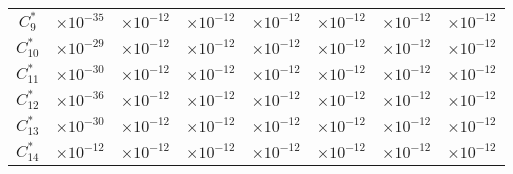 \begin{center}
\begin{tabular}[h]{|c|r|r|r|r|r|r|r|}
    $C_9^*$ &  $\times 10^{-35}$& $\times 10^{-12}$ & $\times 10^{-12}$ & $\times 10^{-12}$ & $\times 10^{-12}$ & $\times 10^{-12}$ & $\times 10^{-12}$ \\
    $C_{10}^*$ & $\times 10^{-29}$& $\times 10^{-12}$ & $\times 10^{-12}$ & $\times 10^{-12}$ & $\times 10^{-12}$ & $\times 10^{-12}$ & $\times 10^{-12}$ \\
    $C_{11}^*$ & $\times 10^{-30}$& $\times 10^{-12}$ & $\times 10^{-12}$ & $\times 10^{-12}$ & $\times 10^{-12}$ & $\times 10^{-12}$ & $\times 10^{-12}$  \\
    $C_{12}^*$ & $\times 10^{-36}$& $\times 10^{-12}$ & $\times 10^{-12}$ & $\times 10^{-12}$ & $\times 10^{-12}$ & $\times 10^{-12}$ & $\times 10^{-12}$  \\
    $C_{13}^*$ & $\times 10^{-30}$& $\times 10^{-12}$ & $\times 10^{-12}$ & $\times 10^{-12}$ & $\times 10^{-12}$ & $\times 10^{-12}$ & $\times 10^{-12}$  \\
    $C_{14}^*$ & $\times 10^{-12}$& $\times 10^{-12}$ & $\times 10^{-12}$ & $\times 10^{-12}$ & $\times 10^{-12}$ & $\times 10^{-12}$ & $\times 10^{-12}$  \\
    \hline
\end{tabular}
\label{tabla_coeficientes_bateman1}
\end{center}

